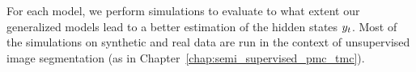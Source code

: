 For each model, we perform simulations to evaluate to what extent our
generalized models lead to a better estimation of the hidden states $y_t$.
Most of the simulations on synthetic and real data are run in the context of
unsupervised image segmentation 
(as in Chapter~\ref{chap:semi_supervised_pmc_tmc}).




